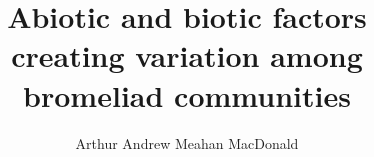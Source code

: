 \documentclass[
12pt         %
,twoside     %
,openright   %
]{mythesis}
\title{Abiotic and biotic factors\\%
  creating variation among\\bromeliad communities}
\author{Arthur Andrew Meahan MacDonald}
\begin{document}
\maketitle




\allcontents


\cleardoublepage
\mainbody





%


\formatbibliography



% 
\end{document}
